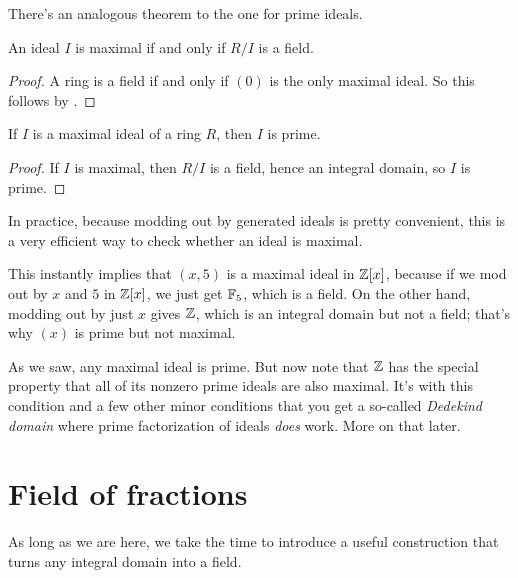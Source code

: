 There's an analogous theorem to the one for prime ideals.
\begin{theorem}
	\label{thm:max_ideal_quotient}
	An ideal $I$ is maximal if and only if $R/I$ is a field.
\end{theorem}
\begin{proof}
	A ring is a field if and only if $(0)$ is the only maximal ideal.
	So this follows by .
\end{proof}

\begin{corollary}
	If $I$ is a maximal ideal of a ring $R$, then $I$ is prime.
\end{corollary}
\begin{proof}
	If $I$ is maximal, then $R/I$ is a field,
	hence an integral domain, so $I$ is prime.
\end{proof}

In practice, because modding out by generated ideals is pretty convenient,
this is a very efficient way to check whether an ideal is maximal.
\begin{example}
	\listhack
	\begin{enumerate}[(a)]
		\ii This instantly implies that $(x,5)$ is a maximal ideal
		in $\mathbb Z[x]$, because if we mod out by $x$ and $5$ in $\mathbb Z[x]$,
		we just get $\mathbb F_5$, which is a field.
		\ii On the other hand, modding out by just $x$ gives $\mathbb Z$,
		which is an integral domain but not a field; that's why $(x)$ is
		prime but not maximal.
	\end{enumerate}
\end{example}

As we saw, any maximal ideal is prime.
But now note that $\mathbb Z$ has the special property that
all of its nonzero prime ideals are also maximal.
It's with this condition and a few other minor conditions
that you get a so-called \emph{Dedekind domain}
where prime factorization of ideals \emph{does} work.
More on that later.

\section{Field of fractions}
As long as we are here, we take the time to introduce a useful
construction that turns any integral domain into a field.

